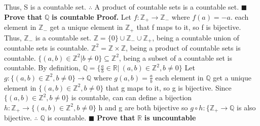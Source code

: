 \documentclass[12pt]{article}
\begin{document}
	\newline
	Thus, S is a countable set.
	\newline
	\(\therefore\) A product of countable sets is a countable set.
	\newline \(\blacksquare\)
	\newpage
	\textbf{Prove that }\(\mathbb{Q}\) \textbf{ is countable}
	\newline \newline
	\textbf{Proof. }
	\newline
	Let \(f: \mathbb{Z}_+ \rightarrow \mathbb{Z}_-\) where \(f(a) = -a\).
	each element in \(\mathbb{Z}_-\) get a unique element in \(\mathbb{Z}_+\) that f maps to it, so f is bijective.
	\newline
	Thus, \(\mathbb{Z}_-\) is a countable set.
	\newline \newline
	\(\mathbb{Z} = \{0\} \cup \mathbb{Z}_- \cup \mathbb{Z}_+\), being a countable union of countable sets is countable. \newline \newline
	\(\mathbb{Z}^2 = \mathbb{Z} \times \mathbb{Z}\), being a product of countable sets is countable.
	\(\{(a,b)\in \mathbb{Z}^2| b \neq 0\} \subseteq \mathbb{Z}^2\), being a subset of a countable set is countable.
	\newline
	\newline
	By definition, \(\mathbb{Q} = \{\frac{a}{b}\in \mathbb{R}|\ (a,b)\in \mathbb{Z}^2, b \neq 0\}\)
	\newline
	Let \(g: \{(a,b)\in \mathbb{Z}^2, b \neq 0\} \rightarrow \mathbb{Q}\) where \(g(a,b) = \frac{a}{b}\)
	\newline
	each element in \(\mathbb{Q}\) get a unique element in \(\{(a,b)\in \mathbb{Z}^2, b \neq 0\}\) that g maps to it, so g is bijective.
	\newline \newline
	Since \(\{(a,b)\in \mathbb{Z}^2, b \neq 0\}\) is countable, can can define a bijection \(h: \mathbb{Z}_+ \rightarrow \{(a,b)\in \mathbb{Z}^2, b \neq 0\}\) \newline \newline
	h and g are both bijective so \(g \circ h : \{\mathbb{Z}_+ \rightarrow \mathbb{Q}\) is also bijective. \newline
	\(\therefore\) \(\mathbb{Q}\) is countable.
	\newline \(\blacksquare\) \newpage
	\textbf{Prove that }\(\mathbb{R}\) \textbf{ is uncountable}
	\newline \newline
\end{document}
